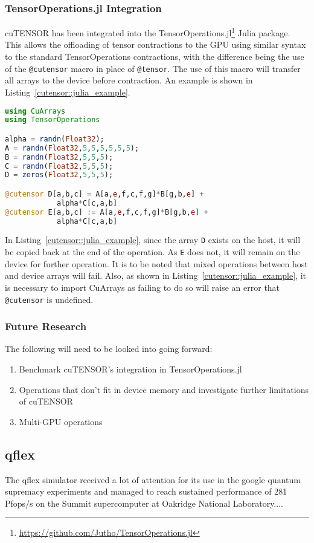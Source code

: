 \subsubsection{TensorOperations.jl Integration} \label{cutensor::julia}
cuTENSOR has been integrated into the TensorOperations.jl\footnote{\url{https://github.com/Jutho/TensorOperations.jl}} Julia package. This allows the offloading of tensor contractions to the GPU using similar syntax to the standard TensorOperations contractions, with the difference being the use of the \texttt{@cutensor} macro in place of \texttt{@tensor}. The use of this macro will transfer all arrays to the device before contraction. An example is shown in Listing~\ref{cutensor::julia_example}.

\begin{lstlisting}[language=Julia, label=cutensor::julia_example, caption=cuTENSOR contraction in Julia]
using CuArrays
using TensorOperations

alpha = randn(Float32);
A = randn(Float32,5,5,5,5,5,5);
B = randn(Float32,5,5,5);
C = randn(Float32,5,5,5);
D = zeros(Float32,5,5,5);

@cutensor D[a,b,c] = A[a,e,f,c,f,g]*B[g,b,e] +
			alpha*C[c,a,b]
@cutensor E[a,b,c] := A[a,e,f,c,f,g]*B[g,b,e] +
			alpha*C[c,a,b]
\end{lstlisting}

\noindent In Listing~\ref{cutensor::julia_example}, since the array \texttt{D} exists on the host, it will be copied back at the end of the operation. As \texttt{E} does not, it will remain on the device for further operation. It is to be noted that mixed operations between host and device arrays will fail. Also, as shown in Listing~\ref{cutensor::julia_example}, it is necessary to import CuArrays as failing to do so will raise an error that \texttt{@cutensor} is undefined.

\subsubsection{Future Research} \label{cutensor::futurework}
The following will need to be looked into going forward:

\begin{enumerate}
\item Benchmark cuTENSOR's integration in TensorOperations.jl
\item Operations that don't fit in device memory and investigate further limitations of cuTENSOR
\item Multi-GPU operations
\end{enumerate}

\subsection{qflex}
The qflex simulator received a lot of attention for its use in the google quantum supremacy experiments \cite{Villalonga2019} and managed to reach sustained performance of 281 Pfops/s on the Summit supercomputer at Oakridge National Laboratory.... 

